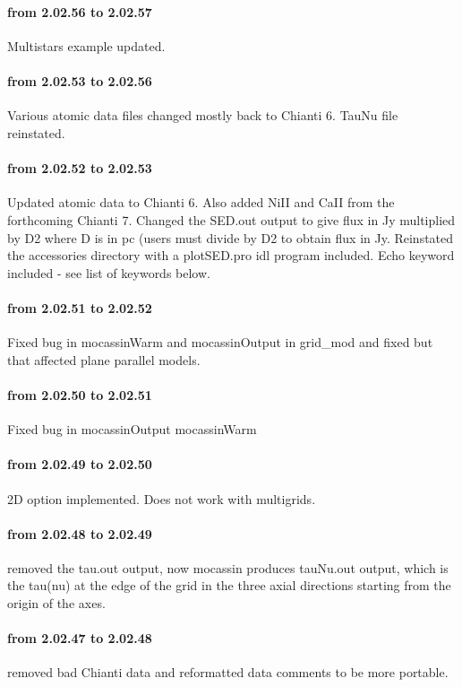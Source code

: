 \documentclass[11pt]{article}
\begin{document}
\pagebreak

\\
\\
\paragraph{from 2.02.56 to 2.02.57} Multistars example updated. 
\paragraph{from 2.02.53 to 2.02.56} Various atomic data files changed mostly back to Chianti 6. TauNu file reinstated.
\paragraph{from 2.02.52 to 2.02.53} Updated atomic data to Chianti 6. Also added NiII and CaII from the forthcoming Chianti 7. Changed the SED.out output to give flux in Jy multiplied by D2 where D is in pc (users must divide by D2 to obtain flux in Jy. Reinstated the accessories directory with a
plotSED.pro idl program included. Echo keyword included - see list of keywords below.
\paragraph{from 2.02.51 to 2.02.52} Fixed bug in mocassinWarm and mocassinOutput in grid\_mod and fixed but that affected plane parallel models.
\paragraph{from 2.02.50 to 2.02.51} Fixed bug in mocassinOutput mocassinWarm
\paragraph{from 2.02.49 to 2.02.50} 2D option implemented. Does not work with multigrids. 
\paragraph{from 2.02.48 to 2.02.49} removed the tau.out output, now mocassin produces tauNu.out output, which is the tau(nu) at the edge of the grid in the three axial directions starting from the origin of the axes. 
\paragraph{from 2.02.47 to 2.02.48} removed bad Chianti data and reformatted data comments to be more portable.
\end{document}
